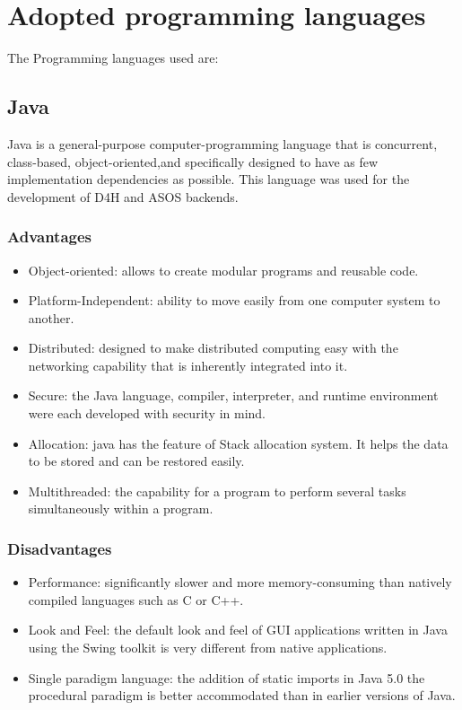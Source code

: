 \documentclass[a4paper, hidelinks, 12pt]{report}
\begin{document}
	\section{Adopted programming languages}
	The Programming languages used are:

	\subsection{Java} Java is a general-purpose computer-programming language that is concurrent, class-based, object-oriented,and specifically designed to have as few implementation dependencies as possible. This language was used for the development of D4H and ASOS backends.

	\subsubsection{Advantages}
	\begin{itemize}
	\item{Object-oriented}: allows to create modular programs and reusable code.
	\item{Platform-Independent}: ability to move easily from one computer system to another.
		\item{Distributed}: designed to make distributed computing easy with the networking capability that is inherently integrated into it.
		\item{Secure}: the Java language, compiler, interpreter, and runtime environment were each developed with security in mind.
		\item{Allocation}: java has the feature of Stack allocation system. It helps the data to be stored and can be restored easily.
		\item{Multithreaded}: the capability for a program to perform several tasks simultaneously within a program.
	\end{itemize}

	\subsubsection{Disadvantages}
	\begin{itemize}
	\item{Performance}: significantly slower and more memory-consuming than natively compiled languages such as C or C++.
	\item{Look and Feel}: the default look and feel of GUI applications written in Java using the Swing toolkit is very different from native applications.
		\item{Single paradigm language}: the addition of static imports in Java 5.0 the procedural paradigm is better accommodated than in earlier versions of Java.
	\end{itemize}
\end{document}
